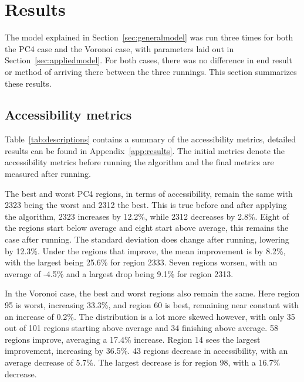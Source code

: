\chapter{Results}\label{sec:results}

The model explained in Section~\ref{sec:generalmodel} was run three times for both the PC4 case and the Voronoi case, with parameters laid out in Section~\ref{sec:appliedmodel}. For both cases, there was no difference in end result or method of arriving there between the three runnings. This section summarizes these results.

\section{Accessibility metrics}
Table~\ref{tab:descriptions} contains a summary of the accessibility metrics, detailed results can be found in Appendix~\ref{app:results}. The initial metrics denote the accessibility metrics before running the algorithm and the final metrics are measured after running.

The best and worst PC4 regions, in terms of accessibility, remain the same with 2323 being the worst and 2312 the best. This is true before and after applying the algorithm, 2323 increases by 12.2\%, while 2312 decreases by 2.8\%. Eight of the regions start below average and eight start above average, this remains the case after running. The standard deviation does change after running, lowering by 12.3\%. Under the regions that improve, the mean improvement is by 8.2\%, with the largest being 25.6\% for region 2333. Seven regions worsen, with an average of -4.5\% and a largest drop being 9.1\% for region 2313.

In the Voronoi case, the best and worst regions also remain the same. Here region 95 is worst, increasing 33.3\%, and region 60 is best, remaining near constant with an increase of 0.2\%. The distribution is a lot more skewed however, with only 35 out of 101 regions starting above average and 34 finishing above average. 58 regions improve, averaging a 17.4\% increase. Region 14 sees the largest improvement, increasing by 36.5\%. 43 regions decrease in accessibility, with an average decrease of 5.7\%. The largest decrease is for region 98, with a 16.7\% decrease.

